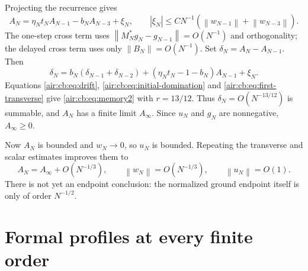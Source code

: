 \documentclass[11pt,letterpaper]{article}
\numberwithin{equation}{section}
\theoremstyle{remark}
\newcommand{\norm}[1]{\left\lVert#1\right\rVert}
\begin{document}
Projecting the recurrence gives
\begin{equation}\label{air:cb:eq:scalar-recurrence}
A_N=\eta_Nt_NA_{N-1}-b_NA_{N-3}+\xi_N,\qquad
|\xi_N|\le CN^{-1}(\norm{w_{N-1}}+\norm{w_{N-3}}).
\end{equation}
The one-step cross term uses
$\norm{M_N^*g_N-g_{N-1}}=O(N^{-1})$ and orthogonality; the delayed cross
term uses only $\norm{B_N}=O(N^{-1})$. Set $\delta_N=A_N-A_{N-1}$. Then
\begin{equation}\label{air:cb:eq:scalar-difference}
\delta_N=b_N(\delta_{N-1}+\delta_{N-2})
+(\eta_Nt_N-1-b_N)A_{N-1}+\xi_N.
\end{equation}
Equations \eqref{air:cb:eq:drift}, \eqref{air:cb:eq:initial-domination} and
\eqref{air:cb:eq:first-transverse} give \eqref{air:cb:eq:memory2} with $r=13/12$.
Thus $\delta_N=O(N^{-13/12})$ is summable, and $A_N$ has a finite limit
$A_\infty$. Since $u_N$ and $g_N$ are nonnegative, $A_\infty\ge0$.

Now $A_N$ is bounded and $w_N\to0$, so $u_N$ is bounded. Repeating the
transverse and scalar estimates improves them to
\begin{equation}\label{air:cb:eq:initial-tracking}
A_N=A_\infty+O(N^{-1/3}),\qquad
\norm{w_N}=O(N^{-1/3}),\qquad \norm{u_N}=O(1).
\end{equation}
There is not yet an endpoint conclusion: the normalized ground endpoint
itself is only of order $N^{-1/2}$.

\section{Formal profiles at every finite order}\label{air:cb:sec:formal}
\end{document}
